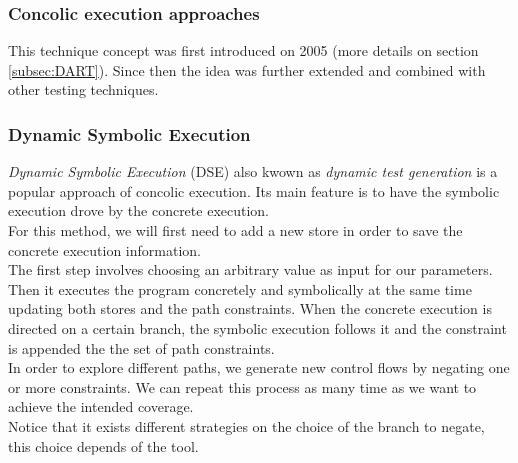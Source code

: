 \documentclass[11pt]{IEEEtran}
\begin{document}
    	\subsubsection*{Concolic execution approaches}
    		This technique concept was first introduced on 2005 \cite{godefroid2005dart} (more details on section \ref{subsec:DART}). %
    	Since then the idea was further extended and combined with other testing techniques.\\

    		\subsubsection{Dynamic Symbolic Execution}
    		\label{subsec:dynamicSymbolicExec}
    			\emph{Dynamic Symbolic Execution} (DSE) also kwown as \emph{dynamic test generation} \cite{godefroid2005dart} is a popular approach of concolic execution. Its main feature is to have the symbolic execution drove by the concrete execution.\\

    			For this method, we will first need to add a new store in order to save the concrete execution information.\\
    			The first step involves choosing an arbitrary value as input for our parameters. Then it executes the program concretely and symbolically at the same time updating both stores and the path constraints. When the concrete execution is directed on a certain branch, the symbolic execution follows it and the constraint is appended the the set of path constraints.\\
    			In order to explore different paths, we generate new control flows by negating one or more constraints. We can repeat this process as many time as we want to achieve the intended coverage.\\

    			Notice that it exists different strategies on the choice of the branch to negate, this choice depends of the tool.\\
\end{document}
